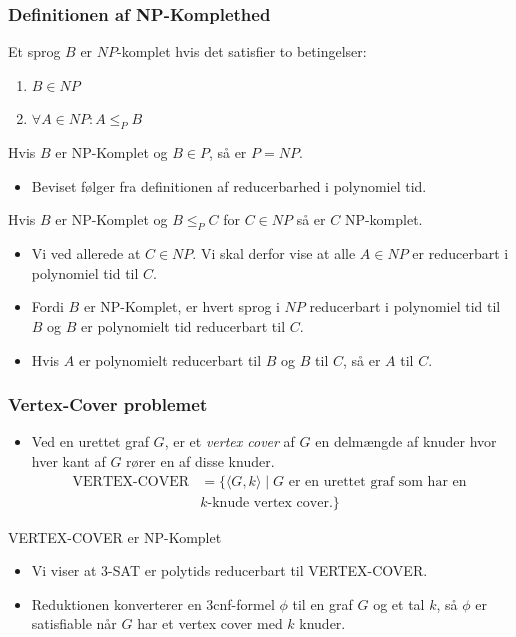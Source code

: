 \begin{frame}[allowframebreaks]
	\frametitle{Definitionen af NP-Komplethed}
	\begin{definition}
		Et sprog $B$ er $NP$-komplet hvis det satisfier to betingelser:
		\begin{enumerate}
			\item $B \in NP$
			\item $\forall A \in NP : A \le_{P} B$
		\end{enumerate}
	\end{definition}

	\begin{theorem}
		Hvis $B$ er NP-Komplet og $B \in P$, så er $P = NP$.
	\end{theorem}

	\begin{itemize}
		\item Beviset følger fra definitionen af reducerbarhed i polynomiel tid.
	\end{itemize}

	\begin{theorem}
		Hvis $B$ er NP-Komplet og $B \le_{P} C$ for $C \in NP$ så er $C$ NP-komplet.
	\end{theorem}
	\begin{itemize}
		\item Vi ved allerede at $C \in NP$. Vi skal derfor vise at alle $A \in NP$ er reducerbart i polynomiel tid til $C$.
		\item Fordi $B$ er NP-Komplet, er hvert sprog i $NP$ reducerbart i polynomiel tid til $B$ og $B$ er polynomielt tid reducerbart til $C$.
		\item Hvis $A$ er polynomielt reducerbart til $B$  og $B$ til $C$, så er $A$ til $C$.
	\end{itemize}
\end{frame}

\begin{frame}[allowframebreaks]
	\frametitle{Vertex-Cover problemet}
	\begin{itemize}
		\item Ved en urettet graf $G$, er et \textit{vertex cover} af $G$ en delmængde af knuder hvor hver kant af $G$ rører en af disse knuder.
		      \begin{align*}
			      \text{VERTEX-COVER} & = \{\langle G , k \rangle \mid G \text{ er en urettet graf som har en } \\
			                          & k\text{-knude vertex cover.}\}
		      \end{align*}
	\end{itemize}
	\begin{theorem}
		VERTEX-COVER er NP-Komplet
	\end{theorem}

	\begin{itemize}
		\item Vi viser at 3-SAT er polytids reducerbart til VERTEX-COVER.
		\item Reduktionen konverterer en 3cnf-formel $\phi$ til en graf $G$ og et tal $k$, så $\phi$ er satisfiable når $G$ har et vertex cover med $k$ knuder.
	\end{itemize}
\end{frame}

